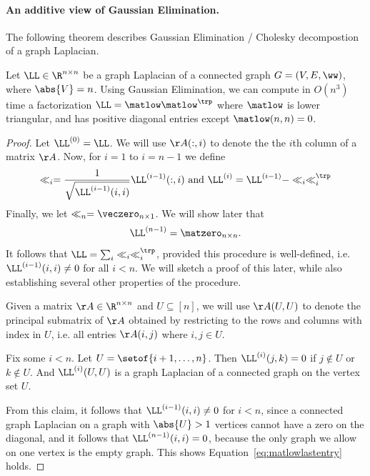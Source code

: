 \paragraph{An additive view of Gaussian Elimination.}
The following theorem describes Gaussian Elimination / Cholesky
decompostion of a graph Laplacian.
\begin{theorem}
 Let $\LL
 \in \R^{n \times n}$ be a graph Laplacian of a connected
 graph $G = (V,E,\ww)$, where
$\abs{V} = n$.
 Using Gaussian Elimination, we can compute in $O(n^3)$ time a
 factorization $\LL = \matlow\matlow^{\trp}$ where $\matlow$ is lower
 triangular, and has positive diagonal entries except $\matlow(n,n) = 0$.
\end{theorem}
\begin{proof}
  Let $\LL^{(0)} = \LL$.
We will use $\AA(:,i)$ to denote the the $i$th column of a matrix $\AA$.
Now, for $i = 1$ to $i = n-1$ we define
\[
  \ll_i = \frac{1}{\sqrt{\LL^{(i-1)}(i,i)}} \LL^{(i-1)}(:,i)
  \text{ and }
   \LL^{(i)}  = \LL^{(i-1)} - \ll_i \ll_i^{\trp}
 \]
 Finally, we let $\ll_n = \veczero_{n \times 1}$.
 We will show later that
 \begin{equation}
   \label{eq:matlowlastentry}
   \LL^{(n-1)} = \matzero_{n \times n}.
 \end{equation}
 It follows that $\LL = \sum_{i} \ll_i \ll_i^{\trp}$, provided this
 procedure is well-defined, i.e. $\LL^{(i-1)}(i,i) \neq 0$ for all $i
< n$. We will sketch a proof of this later, while also establishing
several other properties of the procedure.

Given a matrix $\AA \in \R^{n \times n}$ and $U \subseteq [n]$, we will use $\AA(U, U)$ to
denote the principal submatrix of $\AA$ obtained by restricting to the
rows and columns with index in $U$, i.e. all entries $\AA(i,j)$ where
$i,j \in U$.
\begin{claim}
  \label{clm:schurconnected}
  Fix some $i < n$.
  Let $U = \setof{i+1,\ldots,n}$.
  Then $\LL^{(i)}(j,k) = 0$ if $j \not\in U$ or $k \not\in U$.
  And $\LL^{(i)}(U, U)$ is a graph Laplacian of a connected graph on
  the vertex set $U$.
\end{claim}
From this claim, it follows that $\LL^{(i-1)}(i,i) \neq 0$ for $i<n$,
since a connected graph Laplacian on a graph with $\abs{U} > 1$
vertices cannot have a zero on the diagonal, and it follows that
$\LL^{(n-1)}(i,i) = 0$, because the only graph we allow on one vertex
is the empty graph. This shows Equation~\eqref{eq:matlowlastentry} holds.
\end{proof}

